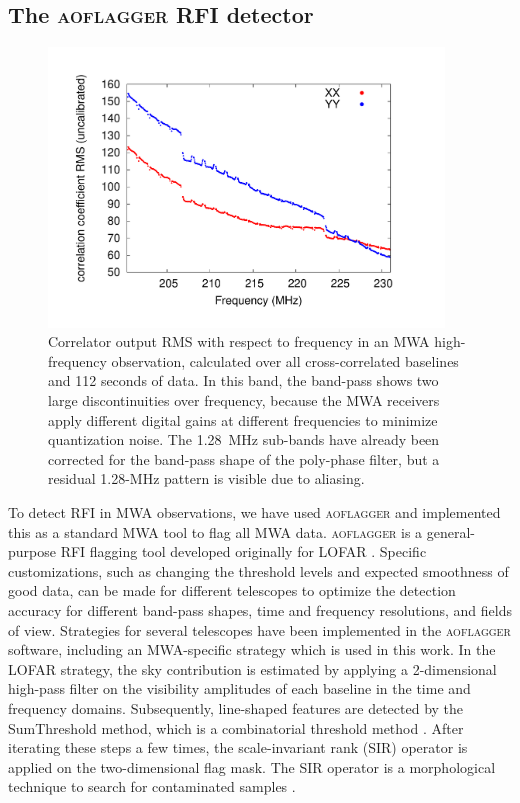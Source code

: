 \documentclass{pasa}
\begin{document}
\subsection{The \textsc{aoflagger} RFI detector}

\begin{figure}
\begin{center}\hspace*{-0.8cm}\includegraphics[width=10.5cm]{img/bandpass}
\caption{Correlator output RMS with respect to frequency in an MWA high-frequency observation, calculated over all cross-correlated baselines and 112 seconds of data. In this band, the band-pass shows two large discontinuities over frequency, because the MWA receivers apply different digital gains at different frequencies to minimize quantization noise. The 1.28~MHz sub-bands have already been corrected for the band-pass shape of the poly-phase filter, but a residual 1.28-MHz pattern is visible due to aliasing.
}
\label{fig:bandpass}
\end{center}
\end{figure}

To detect RFI in MWA observations, we have used \textsc{aoflagger} and implemented this as a standard MWA tool to flag all MWA data. \textsc{aoflagger} is a general-purpose RFI flagging tool developed originally for LOFAR \citep{lofar-radio-environment}. Specific customizations, such as changing the threshold levels and expected smoothness of good data, can be made for different telescopes to optimize the detection accuracy for different band-pass shapes, time and frequency resolutions, and fields of view. Strategies for several telescopes have been implemented in the \textsc{aoflagger} software, including an MWA-specific strategy which is used in this work. In the LOFAR strategy, the sky contribution is estimated by applying a 2-dimensional high-pass filter on the visibility amplitudes of each baseline in the time and frequency domains. Subsequently, line-shaped features are detected by the SumThreshold method, which is a combinatorial threshold method \citep{post-correlation-rfi-classification}. After iterating these steps a few times, the scale-invariant rank (SIR) operator is applied on the two-dimensional flag mask. The SIR operator is a morphological technique to search for contaminated samples \citep{scale-invariant-rank-operator}.
\end{document}

